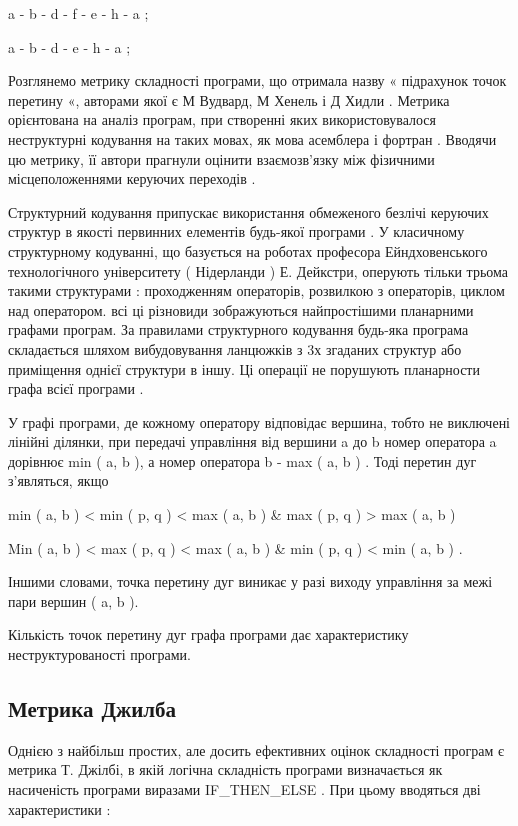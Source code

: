 a - b - d - f - e - h - a ;

a - b - d - e - h - a ;

Розглянемо метрику складності програми, що отримала назву « підрахунок точок перетину «, авторами якої є М Вудвард, М Хенель і Д Хидли . Метрика орієнтована на аналіз програм, при створенні яких використовувалося неструктурні кодування на таких мовах, як мова асемблера і фортран . Вводячи цю метрику, її автори прагнули оцінити взаємозв'язку між фізичними місцеположеннями керуючих переходів .

Структурний кодування припускає використання обмеженого безлічі керуючих структур в якості первинних елементів будь-якої програми . У класичному структурному кодуванні, що базується на роботах професора Ейндховенського технологічного університету ( Нідерланди ) Е. Дейкстри, оперують тільки трьома такими структурами : проходженням операторів, розвилкою з операторів, циклом над оператором. всі ці різновиди зображуються найпростішими планарними графами програм. За правилами структурного кодування будь-яка програма складається шляхом вибудовування ланцюжків з 3х згаданих структур або приміщення однієї структури в іншу. Ці операції не порушують планарности графа всієї програми .

У графі програми, де кожному оператору відповідає вершина, тобто не виключені лінійні ділянки, при передачі управління від вершини a до b номер оператора a дорівнює min ( a, b ), а номер оператора b - max ( a, b ) . Тоді перетин дуг з'являться, якщо

min ( a, b ) \textless{} min ( p, q ) \textless{} max ( a, b ) \& max ( p, q ) \textgreater{} max ( a, b ) \textbar{}

\begin{list}{0em}
\item[] Min ( a, b ) \textless{} max ( p, q ) \textless{} max ( a, b ) \& min ( p, q ) \textless{} min ( a, b ) .
\end{list}

Іншими словами, точка перетину дуг виникає у разі виходу управління за межі пари вершин ( a, b ).

Кількість точок перетину дуг графа програми дає характеристику неструктурованості програми.


\subsection{Метрика Джилба}
\label{2section:id12}
Однією з найбільш простих, але досить ефективних оцінок складності програм є метрика Т. Джілбі, в якій логічна складність програми визначається як насиченість програми виразами IF\_THEN\_ELSE . При цьому вводяться дві характеристики :

